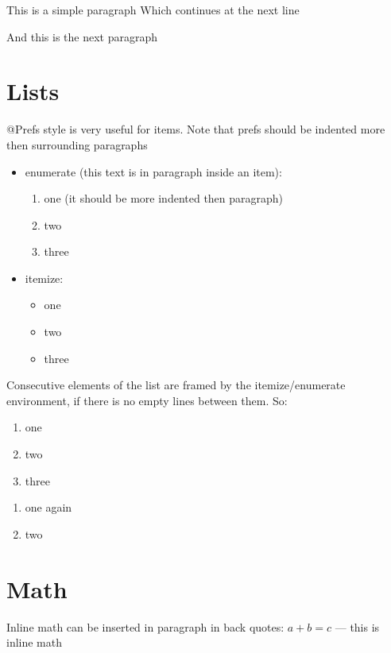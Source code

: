 \documentclass[12pt,a4paper,oneside]{article}
\begin{document}

This is a simple paragraph
Which continues at the next line

And this is the next paragraph

\section{Lists}
{}@Prefs style is very useful for items.
Note that prefs should be indented more then surrounding paragraphs
\begin{itemize}
\item enumerate (this text is in paragraph inside an item):
\begin{enumerate}
\item one (it should be more indented then paragraph)
\item two
\item three
\end{enumerate}
\item itemize:
\begin{itemize}
\item one
\item two
\item three
\end{itemize}
\end{itemize}

Consecutive elements of the list are framed by the itemize/enumerate environment,
if there is no empty lines between them. So:
\begin{enumerate}
\item one
\item two
\item three
\end{enumerate}

\begin{enumerate}
\item one again
\item two
\end{enumerate}

\section{Math}
Inline math can be inserted in paragraph in back quotes: $a + b = c$ 
--- this is inline math
\end{document}
